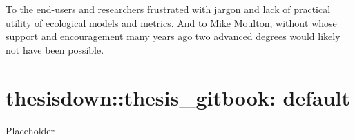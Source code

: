 \documentclass[12pt,twoside,openany]{reedthesis}
\begin{document}
  \begin{dedication}
    To the end-users and researchers frustrated with jargon and lack of
    practical utility of ecological models and metrics. And to Mike Moulton,
    without whose support and encouragement many years ago two advanced
    degrees would likely not have been possible.
  \end{dedication}
\mainmatter %
\pagestyle{fancyplain} %
\linespread{1} %

\chapter{thesisdown::thesis\_gitbook:
default}\label{thesisdownthesis_gitbook-default}

Placeholder
\end{document}
